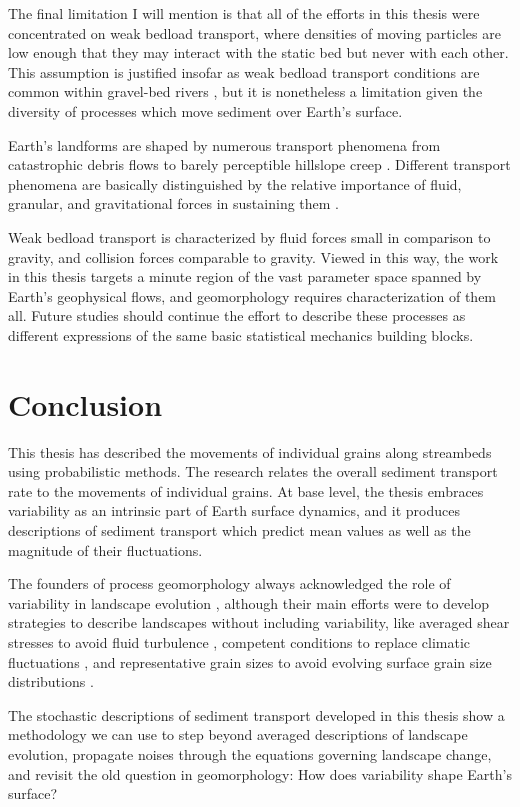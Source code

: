 The final limitation I will mention is that all of the efforts in this thesis were concentrated on weak bedload transport, where densities of moving particles are low enough that they may interact with the static bed but never with each other. This assumption is justified insofar as weak bedload transport conditions are common within gravel-bed rivers \citep{Ashworth1989,Warburton1992}, but it is nonetheless a limitation given the diversity of processes which move sediment over Earth's surface.

Earth's landforms are shaped by numerous transport phenomena from catastrophic debris flows \citep{Iverson1997} to barely perceptible hillslope creep \citep{Deshpande2021}.
Different transport phenomena are basically distinguished by the relative importance of fluid, granular, and gravitational forces in sustaining them \citep{Jerolmack2019}.

Weak bedload transport is characterized by fluid forces small in comparison to gravity, and collision forces comparable to gravity.
Viewed in this way, the work in this thesis targets a minute region of the vast parameter space spanned by Earth's geophysical flows, and geomorphology requires characterization of them all.
Future studies should continue the effort \citep[e.g.][]{Furbish2021a} to describe these processes as different expressions of the same basic statistical mechanics building blocks.

\section{Conclusion}

This thesis has described the movements of individual grains along streambeds using probabilistic methods.
The research relates the overall sediment transport rate to the movements of individual grains.
At base level, the thesis embraces variability as an intrinsic part of Earth surface dynamics, and it produces descriptions of sediment transport which predict mean values as well as the magnitude of their fluctuations.

The founders of process geomorphology always acknowledged the role of variability in landscape evolution \citep{Horton1945,Strahler1952,Langbein1964}, although their main efforts were to develop strategies to describe landscapes without including variability, like averaged shear stresses to avoid fluid turbulence \citep{MeyerPeter1948,Bagnold1954}, competent conditions to replace climatic fluctuations \citep{Wolman1959,Wolman1978}, and representative grain sizes to avoid evolving surface grain size distributions \citep{Parker1982,Andrews1983}.

The stochastic descriptions of sediment transport developed in this thesis show a methodology we can use to step beyond averaged descriptions of landscape evolution, propagate noises through the equations governing landscape change, and revisit the old question in geomorphology: How does variability shape Earth's surface?

